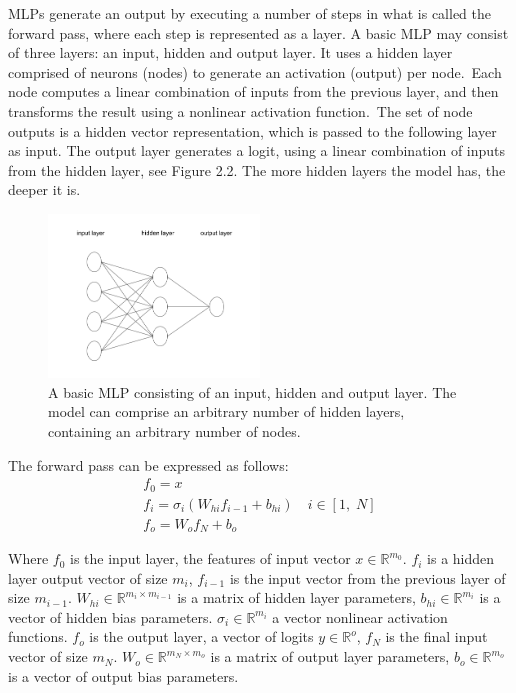 \noindent MLPs generate an output by executing a number of steps in what is called the forward pass, where each step is represented as a layer. A basic MLP may consist of three layers: an input, hidden and output layer. It uses a hidden layer comprised of neurons (nodes) to generate an activation (output) per node.\ Each node computes a linear combination of inputs from the previous layer, and then transforms the result using a nonlinear activation function.\ The set of node outputs is a hidden vector representation, which is passed to the following layer as input. The output layer generates a logit, using a linear combination of inputs from the hidden layer, see Figure 2.2. The more hidden layers the model has, the deeper it is.

\begin{figure}[H]
   	\centering
    	\includegraphics[width=0.5\textwidth, height=0.3\textwidth]{multilayer_perceptron}
	\captionsetup{justification=centering}
	\caption{A basic MLP consisting of an input, hidden and output layer. The model can comprise an arbitrary number of hidden layers, containing an arbitrary number of nodes.}
\end{figure}

\noindent The forward pass can be expressed as follows:
\begin{subequations}
	\begin{gather}
		f_0 = x \\
		f_i=\sigma_i(W_{hi}f_{i - 1} + b_{hi}) \quad i \in [1, \; N] \\
		f_o = W_{o}f_N + b_o
	\end{gather}
\end{subequations}

\noindent Where $ f_0 $ is the input layer, the features of input vector $ x \in \mathbb{R}^{m_0} $. $ f_i $ is a hidden layer output vector of size $ m_i $, $ f_{i - 1} $ is the input vector from the previous layer of size $ m_{i-1} $. $ W_{hi} \in \mathbb{R}^{m_i \times m_{i - 1}} $ is a matrix of hidden layer parameters, $ b_{hi} \in \mathbb{R}^{m_i} $ is a vector of hidden bias parameters. $ \sigma_i \in \mathbb{R}^{m_i} $ a vector nonlinear activation functions. $ f_o $ is the output layer, a vector of logits $ y \in \mathbb{R}^o $, $ f_N $ is the final input vector of size $ m_{N} $. $ W_{o} \in \mathbb{R}^{m_N \times m_o} $ is a matrix of output layer parameters, $ b_{o} \in \mathbb{R}^{m_o} $ is a vector of output bias parameters.

